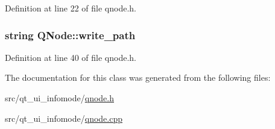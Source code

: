 Definition at line 22 of file qnode.\+h.

\subsubsection[{\texorpdfstring{write\+\_\+path}{write_path}}]{\setlength{\rightskip}{0pt plus 5cm}string Q\+Node\+::write\+\_\+path}\hypertarget{class_q_node_a0967d1922eeb7e39eedca309c7003d23}{}\label{class_q_node_a0967d1922eeb7e39eedca309c7003d23}


Definition at line 40 of file qnode.\+h.



The documentation for this class was generated from the following files\+:\begin{DoxyCompactItemize}
\item 
src/qt\+\_\+ui\+\_\+infomode/\hyperlink{qnode_8h}{qnode.\+h}\item 
src/qt\+\_\+ui\+\_\+infomode/\hyperlink{qnode_8cpp}{qnode.\+cpp}\end{DoxyCompactItemize}
